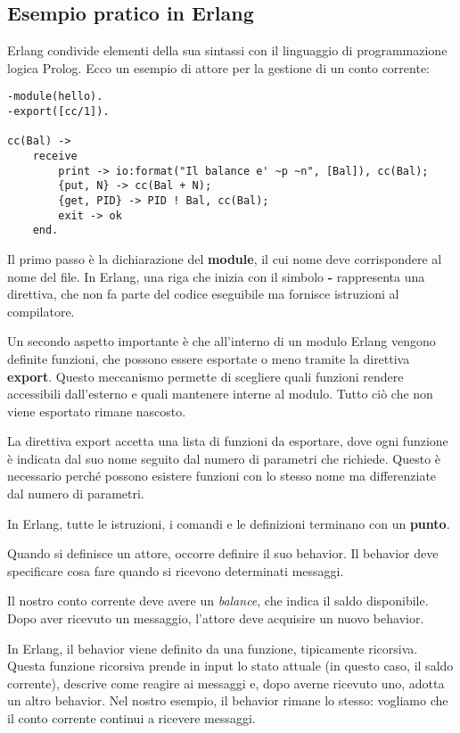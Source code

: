 \documentclass{article}
\begin{document}
\subsection*{Esempio pratico in Erlang}
Erlang condivide elementi della sua sintassi con il linguaggio di programmazione logica Prolog. Ecco un esempio di attore per la gestione di un conto corrente:
\begin{tcolorbox}
\begin{verbatim}
-module(hello).
-export([cc/1]).

cc(Bal) -> 
    receive
        print -> io:format("Il balance e' ~p ~n", [Bal]), cc(Bal);
        {put, N} -> cc(Bal + N);
        {get, PID} -> PID ! Bal, cc(Bal);
        exit -> ok
    end.
\end{verbatim}
\end{tcolorbox}
Il primo passo è la dichiarazione del \textbf{module}, il cui nome deve corrispondere al nome del file. In Erlang, una riga che inizia con il simbolo \textbf{-} rappresenta una direttiva, che non fa parte del codice eseguibile ma fornisce istruzioni al compilatore.

Un secondo aspetto importante è che all'interno di un modulo Erlang vengono definite funzioni, che possono essere esportate o meno tramite la direttiva \textbf{export}. Questo meccanismo permette di scegliere quali funzioni rendere accessibili dall'esterno e quali mantenere interne al modulo. Tutto ciò che non viene esportato rimane nascosto. 

La direttiva export accetta una lista di funzioni da esportare, dove ogni funzione è indicata dal suo nome seguito dal numero di parametri che richiede. Questo è necessario perché possono esistere funzioni con lo stesso nome ma differenziate dal numero di parametri.

In Erlang, tutte le istruzioni, i comandi e le definizioni terminano con un \textbf{punto}.

Quando si definisce un attore, occorre definire il suo behavior. Il behavior deve specificare cosa fare quando si ricevono determinati messaggi.

Il nostro conto corrente deve avere un \textit{balance}, che indica il saldo disponibile. Dopo aver ricevuto un messaggio, l'attore deve acquisire un nuovo behavior.

In Erlang, il behavior viene definito da una funzione, tipicamente ricorsiva. Questa funzione ricorsiva prende in input lo stato attuale (in questo caso, il saldo corrente), descrive come reagire ai messaggi e, dopo averne ricevuto uno, adotta un altro behavior. Nel nostro esempio, il behavior rimane lo stesso: vogliamo che il conto corrente continui a ricevere messaggi.
\end{document}
